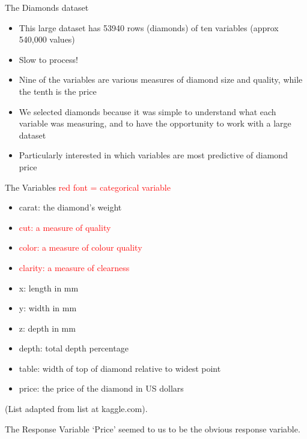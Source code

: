 \documentclass[
  ignorenonframetext,
]{beamer}
\providecommand{\tightlist}{%
  \setlength{\itemsep}{0pt}\setlength{\parskip}{0pt}}
\begin{document}
\begin{frame}{The Diamonds dataset}
\protect\hypertarget{the-diamonds-dataset}{}
\begin{itemize}
\tightlist
\item
  This large dataset has 53940 rows (diamonds) of ten variables (approx
  540,000 values)\linebreak 
\item
  Slow to process!\linebreak
\item
  Nine of the variables are various measures of diamond size and
  quality, while the tenth is the price\linebreak
\item
  We selected diamonds because it was simple to understand what each
  variable was measuring, and to have the opportunity to work with a
  large dataset\linebreak
\item
  Particularly interested in which variables are most predictive of
  diamond price
\end{itemize}
\end{frame}

\begin{frame}{The Variables}
\protect\hypertarget{the-variables}{}
\textcolor{red}{red font = categorical variable}

\begin{itemize}
\tightlist
\item
  carat: the diamond's weight
\item
  \textcolor{red}{cut: a measure of quality}
\item
  \textcolor{red}{color: a measure of colour quality}
\item
  \textcolor{red}{clarity: a measure of clearness}
\item
  x: length in mm
\item
  y: width in mm
\item
  z: depth in mm
\item
  depth: total depth percentage
\item
  table: width of top of diamond relative to widest point
\item
  price: the price of the diamond in US dollars
\end{itemize}

(List adapted from list at kaggle.com).
\end{frame}

\begin{frame}{The Response Variable}
\protect\hypertarget{the-response-variable}{}
`Price' seemed to us to be the obvious response variable.
\end{frame}
\end{document}
